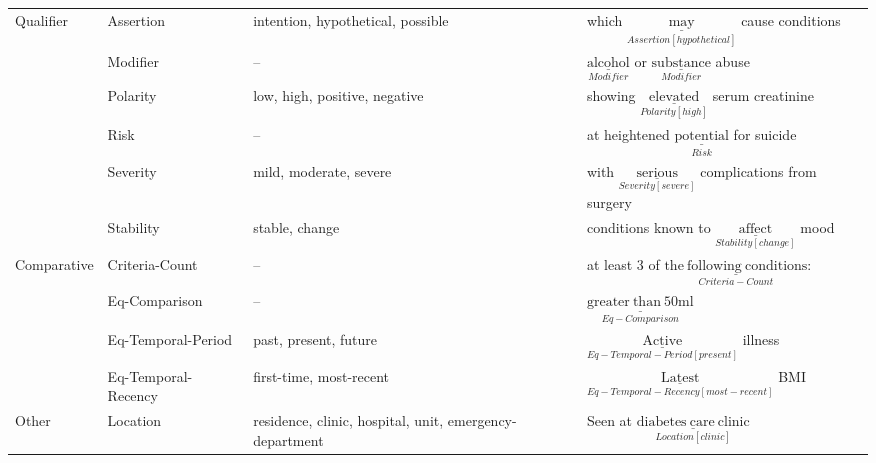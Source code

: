\begin{tabular}{m{2cm} m{2.5cm} m{4.9cm} m{6.5cm}}
    \multirow{6}{*}[-16pt]{\mbox{Qualifier}} &
        Assertion
            & intention, hypothetical, possible
            & which $\underset{Assertion[hypothetical]}{\underline{\mathrm{may}}}$ cause conditions \\
         & Modifier
            & --
            & $\underset{Modifier}{\underline{\mathrm{alcohol}}}$ or $\underset{Modifier}{\underline{\mathrm{substance}}}$ abuse  \\
         & Polarity 
                & low, high, positive, negative 
                & showing $\underset{Polarity[high]}{\underline{\mathrm{elevated}}}$ serum creatinine  \\
         & Risk
            & -- 
            & at heightened $\underset{Risk}{\underline{\mathrm{potential}}}$ for suicide \\
         & Severity 
            & mild, moderate, severe 
            & with $\underset{Severity[severe]}{\underline{\mathrm{serious}}}$ complications from surgery  \\
         & Stability 
                & stable, change 
                & conditions known to $\underset{Stability[change]}{\underline{\mathrm{affect}}}$ mood \\[2ex]
    \hline
     \multirow{4}{*}[-17pt]{\mbox{Comparative}} &
        Criteria-Count
            & --
            & at least 3 of $\underset{Criteria-Count}{\underline{\mathrm{the\ following\ conditions}}}$: \\
      & Eq-Comparison
            & --
            & $\underset{Eq-Comparison}{\underline{\mathrm{greater\ than\ 50ml}}}$ \\
     
      & Eq-Temporal-Period
            & past, present, future
            & $\underset{Eq-Temporal-Period[present]}{\underline{\mathrm{Active}}}$ illness \\
      & Eq-Temporal-Recency
            & first-time, most-recent
            & $\underset{Eq-Temporal-Recency[most-recent]}{\underline{\mathrm{Latest}}}$ BMI \\
            
    \hline   
    Other &
       Location 
            & residence, clinic, hospital, unit, emergency-department  
            & Seen at $\underset{Location[clinic]}{\underline{\mathrm{diabetes\ care\ clinic}}}$ \\[2ex]
    
\end{tabular}